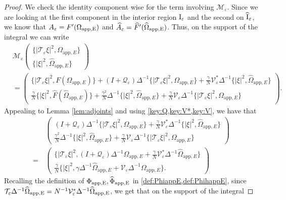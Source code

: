 \documentclass[11pt,reqno,a4paper]{amsart}
\def\eps{\varepsilon}
\newcommand{\cM}{\mathcal{M}}
\newcommand{\cQ}{\mathcal{Q}}
\newcommand{\cT}{\mathcal{T}}
\newcommand{\cV}{\mathcal{V}}
\newcommand{\app}{\mathrm{app}}
\newcommand{\1}{\mathbbm{1}}
\theoremstyle{definition}
\theoremstyle{definition}
\numberwithin{equation}{section}
\begin{document}
    \begin{proof}
        We check the identity component wise for the term involving $\cM_{\eps}$. Since we are looking at the first component in the interior region ${\rm I}_\eps$ and the second on $\widehat{{\rm I}}_{\eps}$, we know that $A_{\eps}=F'(\Omega_{\rm app,E})$ and $\widehat{A}_{\eps}=\widehat{F}'(\widehat{\Omega}_{\rm app,E})$. Thus, on the support of the integral we can write
        \begin{align}
    &\cM_{\eps}\begin{pmatrix}
        \{|\cT_{\eps} \xi|^2,\Omega_{\app,E}\}\\
        \{|\xi|^2,\widehat{\Omega}_{\app,E}\}
\end{pmatrix}\\
&=\begin{pmatrix}
        \{|\cT_{\eps} \xi|^2,F(\Omega_{\app,E})\}+(I+\cQ_{\eps})\Delta^{-1}\{|\cT_{\eps} \xi|^2,\Omega_{\app,E}\}+\frac{\gamma}{N}\cV_{\eps}^*\Delta^{-1}\{| \xi|^2,\widehat{\Omega}_{\app,E}\}\\
          \frac{\gamma}{N}\{|\xi|^2,\widehat{F}(\widehat{\Omega}_{\app,E})\}+\frac{\gamma^2}{N}\Delta^{-1}\{| \xi|^2,\widehat{\Omega}_{\app,E}\}+\frac{\gamma}{N}\cV_{\eps}\Delta^{-1}\{| \cT_{\eps}\xi|^2,{\Omega}_{\app,E}\}
    \end{pmatrix}.
        \end{align}
        Appealing to Lemma \ref{lem:adjoints} and using \cref{key:Q,key:V*,key:V}, we have that 
        \begin{align}
        &  \begin{pmatrix}
    (I+\cQ_{\eps})\Delta^{-1}\{|\cT_{\eps} \xi|^2,\Omega_{\app,E}\}+\frac{\gamma}{N}\cV_{\eps}^*\Delta^{-1}\{| \xi|^2,\widehat{\Omega}_{\app,E}\}\\
       \frac{\gamma^2}{N}\Delta^{-1}\{| \xi|^2,\widehat{\Omega}_{\app,E}\}+\frac{\gamma}{N}\cV_{\eps}\Delta^{-1}\{| \cT_{\eps}\xi|^2,{\Omega}_{\app,E}\}    \end{pmatrix}\\
       =\, &
    \begin{pmatrix}
    \{|\cT_{\eps} \xi|^2,(I+\cQ_{\eps})\Delta^{-1}\Omega_{\app,E}+\frac{\gamma}{N}\cV_{\eps}^*\Delta^{-1}\widehat{\Omega}_{\app,E}\}\\
       \frac{\gamma}{N}\{| \xi|^2,\gamma \Delta^{-1}\widehat{\Omega}_{\app,E}+\cV_{\eps}\Delta^{-1}{\Omega}_{\app,E}\}.    \end{pmatrix}
        \end{align}
        Recalling the definition of $\Phi_{\rm app,E},\widehat{\Phi}_{\rm app,E}$ in \cref{def:PhiappE,def:PhihappE}, since  $\cT_{\eps}\Delta^{-1}\widehat{\Omega}_{\rm app,E}=N^{-1}\cV_\eps^*\Delta^{-1}\widehat{\Omega}_{\rm app,E}$, we get that on the support of the integral

\end{proof}
\end{document}
